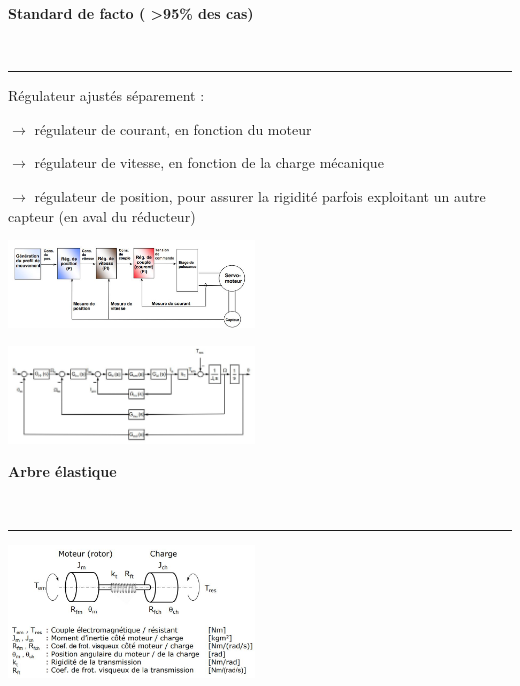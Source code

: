 \documentclass[	DIV=calc,%
							paper=a4,%
							fontsize=10pt,%
							twocolumn]{scrartcl} %
\newcounter{mycounter}
\newcommand{\formdesc}[1]{\large\textbf{#1} \addtocounter{mycounter}{1} \hfill \themycounter \\ \vspace{-3mm} \hrule \vspace{2mm}}
\begin{document}
\formdesc{Standard de facto ( >95\% des cas)}

Régulateur ajustés séparement :

$\rightarrow $ régulateur de courant, en fonction du moteur

$\rightarrow $ régulateur de vitesse, en fonction de la charge mécanique

$\rightarrow $ régulateur de position, pour assurer la rigidité parfois exploitant un autre capteur (en aval du réducteur)

\includegraphics[width=0.49\textwidth]{img/stad_facto.JPG}


\includegraphics[width=0.49\textwidth]{img/stad_facto_2.JPG}

\formdesc{Arbre élastique }

\includegraphics[width=0.49\textwidth]{img/arbre_elastique.JPG}
\end{document}
